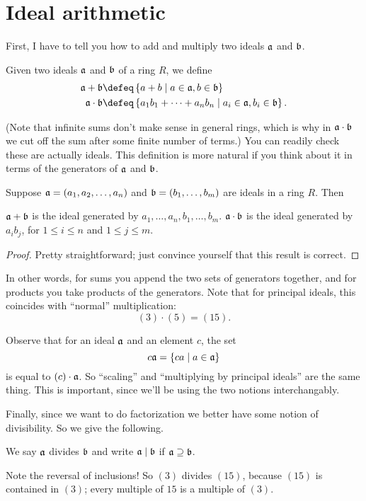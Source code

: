 \section{Ideal arithmetic}
First, I have to tell you how to add and multiply two ideals $\aa$ and $\bb$.
\begin{definition}
	Given two ideals $\aa$ and $\bb$ of a ring $R$, we define
	\begin{align*}
		\aa + \bb &\defeq \left\{ a+b \mid a \in \aa, b \in \bb \right\} \\
		\aa \cdot \bb &\defeq \left\{ a_1b_1 + \dots + a_nb_n \mid a_i \in \aa, b_i \in \bb \right\}.
	\end{align*}
\end{definition}
(Note that infinite sums don't make sense in general rings, which is why in $\aa \cdot \bb$
we cut off the sum after some finite number of terms.)
You can readily check these are actually ideals.
This definition is more natural if you think about it in terms of 
the generators of $\aa$ and $\bb$.
\begin{proposition}
	Suppose $\aa = \left( a_1, a_2, \dots, a_n \right)$
	and $\bb = \left( b_1, \dots, b_m \right)$ are ideals in a ring $R$.
	Then
	\begin{enumerate}[(a)]
		\ii $\aa + \bb$ is the ideal generated by $a_1, \dots, a_n, b_1, \dots, b_m$.
		\ii $\aa \cdot \bb$ is the ideal generated by $a_i b_j$, for $1 \le i \le n$ and $1 \le j \le m$.
	\end{enumerate}
\end{proposition}
\begin{proof}
	Pretty straightforward; just convince yourself that this result is correct.
\end{proof}
In other words, for sums you append the two sets of generators together,
and for products you take products of the generators.
Note that for principal ideals, this coincides with ``normal'' multiplication:
\[ (3) \cdot (5) = (15). \]
\begin{remark}
	Observe that for an ideal $\aa$ and an element $c$,
	the set \[ c \aa = \left\{ ca \mid a \in \aa \right\} \]
	is equal to $(c) \cdot \aa$.
	So ``scaling'' and ``multiplying by principal ideals'' are the same thing.
	This is important, since we'll be using the two notions interchangably.
\end{remark}

Finally, since we want to do factorization we better have some notion of divisibility.
So we give the following.
\begin{definition}
	We say $\aa$ divides $\bb$ and write $\aa \mid \bb$ if $\aa \supseteq \bb$.
\end{definition}
Note the reversal of inclusions!
So $(3)$ divides $(15)$, because $(15)$ is contained in $(3)$;
every multiple of $15$ is a multiple of $(3)$.

